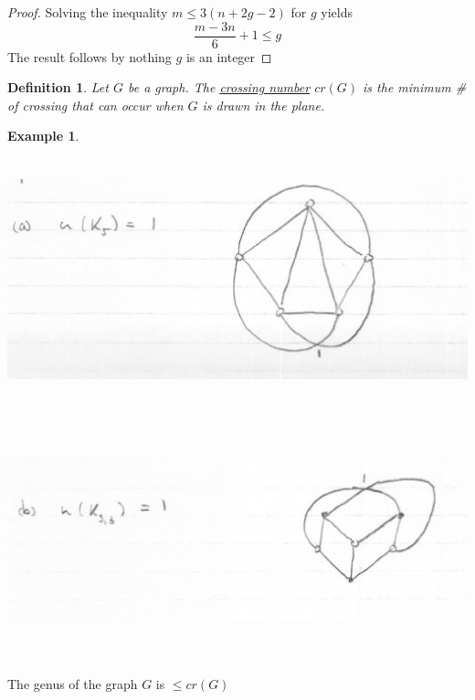\documentclass[12pt]{article}
\newenvironment{theorem}[1]{%
  \renewcommand\themanualtheoreminner{#1}%
  \manualtheoreminner
}{\endmanualtheoreminner}
\newtheorem{example}{Example}
\newtheorem{definition}{Definition}
\begin{document}
\begin{proof}
	Solving the inequality $m\le 3(n + 2g -2)$ for $g$ yields
	\[\frac{m-3n}{6} + 1 \le g\]
	The result follows by nothing $g$ is an integer

\end{proof}

\begin{definition}
	Let $G$ be a graph. The \underline{crossing number} $cr(G)$ is the minimum \# of crossing that can occur when $G$ is drawn in the plane.
\end{definition}

\begin{example}\

	\begin{center}
		\includegraphics[width=15cm, height=7cm]{crossinga}
	\end{center}

	\begin{center}
		\includegraphics[width=14cm, height=7cm]{crossingb}
	\end{center}

\end{example}


\begin{theorem}{9}
	The genus of the graph $G$ is $\le cr(G)$
\end{theorem}
\end{document}
